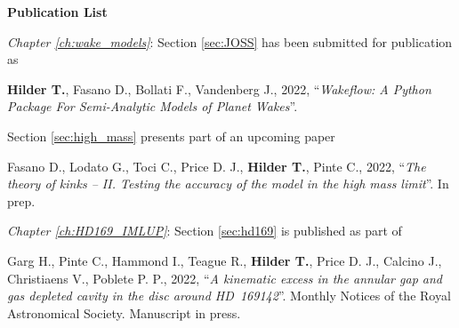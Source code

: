{}

\begin{center}
    
    {\Large \textbf{Publication List}}
    
\end{center}

\setlength{\parindent}{0pt}

\vspace{0.5cm}

\textit{Chapter \ref{ch:wake_models}}: \hspace{2pt}Section \ref{sec:JOSS} has been submitted for publication as


\begin{myquote}{58pt}
    \textbf{Hilder T.}, Fasano D., Bollati F., Vandenberg J., 2022, ``\textit{Wakeflow: A Python Package For Semi-Analytic Models of Planet Wakes}''.
\end{myquote}

\hspace{58pt}Section \ref{sec:high_mass} presents part of an upcoming paper

\begin{myquote}{58pt}
    Fasano D., Lodato G., Toci C., Price D. J., \textbf{Hilder T.}, Pinte C., 2022, ``\textit{The theory of kinks -- II. Testing the accuracy of the model in the high mass limit}''. In prep.
\end{myquote}

\vspace{0.5cm}

%
%

\textit{Chapter \ref{ch:HD169_IMLUP}}: \hspace{2pt}Section \ref{sec:hd169} is published as part of

\begin{myquote}{58pt}
    Garg H., Pinte C., Hammond I., Teague R., \textbf{Hilder T.}, Price D. J., Calcino J., Christiaens V., Poblete P. P., 2022, ``\textit{A kinematic excess in the annular gap and gas depleted cavity in the disc around HD~169142}''. Monthly Notices of the Royal Astronomical Society. Manuscript in press.
\end{myquote}

